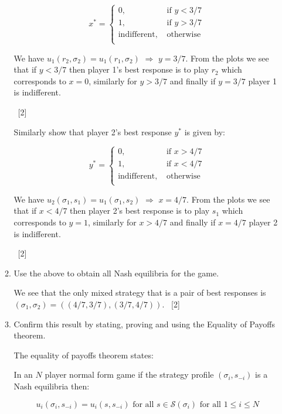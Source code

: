 \documentclass[12pt,a4paper]{article}
\begin{document}
\begin{enumerate}
\begin{enumerate}
            \[
            x^*=\begin{cases}
                0,&\text{ if } y < 3/7\\
                1,&\text{ if } y > 3/7\\
                \text{indifferent},&\text{ otherwise }\\
            \end{cases}
            \]

            We have $u_1(r_2,\sigma_2)=u_1(r_1,\sigma_2)$ $\Rightarrow$ $y=3/7$. From the plots we see that if $y<3/7$ then player 1's best response is to play $r_2$ which corresponds to $x=0$, similarly for $y>3/7$ and finally if $y=3/7$ player 1 is indifferent.

        ~\hfill{[2]}

            Similarly show that player 2's best response $y^*$ is given by:

            \[
            y^*=\begin{cases}
                0,&\text{ if } x > 4/7\\
                1,&\text{ if } x < 4/7\\
                \text{indifferent},&\text{ otherwise }\\
            \end{cases}
            \]

            We have $u_2(\sigma_1,s_1)=u_1(\sigma_1,s_2)$ $\Rightarrow$ $x=4/7$. From the plots we see that if $x<4/7$ then player 2's best response is to play $s_1$ which corresponds to $y=1$, similarly for $x>4/7$ and finally if $x=4/7$ player 2 is indifferent.

        ~\hfill{[2]}

        \item Use the above to obtain all Nash equilibria for the game.

        We see that the only mixed strategy that is a pair of best responses is $(\sigma_1,\sigma_2)=((4/7,3/7),(3/7,4/7))$.
        ~\hfill{[2]}

        \item Confirm this result by stating, proving and using the Equality of Payoffs theorem.

            The equality of payoffs theorem states:

            In an $N$ player normal form game if the strategy profile $(\sigma_i,s_{-i})$ is a Nash equilibria then:

            $$u_{i}(\sigma_i,s_{-i})=u_{i}(s,s_{-i})\text{ for all }s\in\mathcal{S}(\sigma_i)\text{ for all }1\leq i\leq N$$


\end{enumerate}
\end{enumerate}
\end{document}
